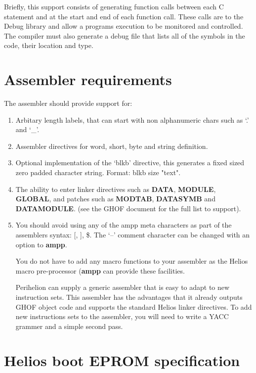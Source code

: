 Briefly, this support consists of generating function calls between each
C statement and at the start and end of each function call. These calls are to
the Debug library and allow a programs execution to be monitored and
controlled. The compiler must also generate a debug file that lists all of the
symbols in the code, their location and type.

\section{Assembler requirements}

The assembler should provide support for:

\begin{enumerate}

\item Arbitary length labels, that can start with
non alphanumeric chars such as `.' and `\_'.

\item Assembler directives for word, short, byte and string definition.

\item Optional implementation of the `blkb' directive, this generates a
fixed sized zero padded character string. Format: blkb size "text".

\item The ability to enter linker directives such as {\bf DATA}, {\bf MODULE},
{\bf GLOBAL}, and patches such as {\bf MODTAB}, {\bf DATASYMB} and
{\bf DATAMODULE}.
(see the GHOF document for the full list to support).

\item You should avoid using any of the ampp meta characters as part of the
assemblers syntax: [, ], \$. The `--' comment character can be changed
with an option to {\bf ampp}.

You do not have to add any macro functions to your assembler as the
Helios macro pre-processor ({\bf ampp} can provide these facilities.

Perihelion can supply a generic assembler that is easy to adapt to new
instruction sets. This assembler has the advantages that it already
outputs GHOF object code and supports the standard Helios linker directives.
To add new instructions sets to the assembler, you will need to write a
YACC grammer and a simple second pass.
\end{enumerate}

\section{Helios boot EPROM specification}


